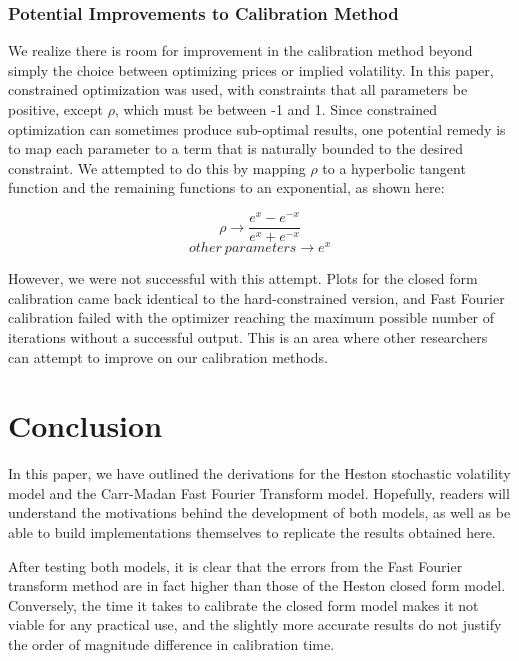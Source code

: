 \documentclass[fontsize=12pt]{article}
\numberwithin{equation}{section} %
\numberwithin{figure}{section} %
\numberwithin{table}{section} %
\begin{document}
\subsubsection{Potential Improvements to Calibration Method} \label{Improvements}

We realize there is room for improvement in the calibration method beyond simply the choice between optimizing prices or implied volatility. In this paper, constrained optimization was used, with constraints that all parameters be positive, except $\rho$, which must be between -1 and 1. Since constrained optimization can sometimes produce sub-optimal results, one potential remedy is to map each parameter to a term that is naturally bounded to the desired constraint. We attempted to do this by mapping $\rho$ to a hyperbolic tangent function and the remaining functions to an exponential, as shown here:

\begin{equation} \rho \rightarrow \dfrac{e^{x} - e^{-x}} {e^{x} + e^{-x}} \end{equation} 
\begin{equation} other \: parameters \rightarrow e^{x} \end{equation}

However, we were not successful with this attempt. Plots for the closed form calibration came back identical to the hard-constrained version, and Fast Fourier calibration failed with the optimizer reaching the maximum possible number of iterations without a successful output. This is an area where other researchers can attempt to improve on our calibration methods.
\newpage

\section{Conclusion} \label{Conclusion}

In this paper, we have outlined the derivations for the Heston stochastic volatility model and the Carr-Madan Fast Fourier Transform model. Hopefully, readers will understand the motivations behind the development of both models, as well as be able to build implementations themselves to replicate the results obtained here.


	After testing both models, it is clear that the errors from the Fast Fourier transform method are in fact higher than those of the Heston closed form model. Conversely, the time it takes to calibrate the closed form model makes it not viable for any practical use, and the slightly more accurate results do not justify the order of magnitude difference in calibration time. 
\end{document}
